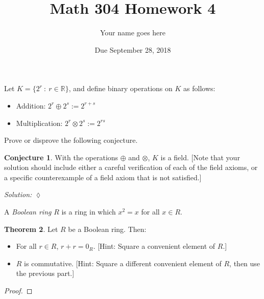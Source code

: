 \documentclass[11pt]{article}		%
\title{Math 304 Homework 4}
\author{Your name goes here}
\date{Due September 28, 2018}
\def\R{{\mathbb R}}
\theoremstyle{definition}
\newtheorem{theorem}{Theorem}
\newtheorem{conj}[theorem]{Conjecture}
\begin{document}
\maketitle


Let $K = \{2^r \ : \ r\in \R\}$, and define binary operations on $K$ as follows:
\begin{itemize}
	\item Addition: $2^r \oplus 2^s := 2^{r+s}$
	\item Multiplication: $2^r \otimes 2^s := 2^{rs}$
\end{itemize}

Prove or disprove the following conjecture.

\begin{conj}
	With the operations $\oplus$ and $\otimes$, $K$ is a field. [Note that your solution should include either a careful verification of each of the field axioms, or a specific counterexample of a field axiom that is not satisfied.]
\end{conj}

\medskip

\noindent\textit{Solution:}				 \hfill $\lozenge$


\bigskip

A \textit{Boolean ring} $R$ is a ring in which $x^2 = x$ for all $x\in R$.

\begin{theorem}
	Let $R$ be a Boolean ring.
	Then: 
	\begin{itemize}
		\item For all $r\in R$, $r + r = 0_R$. [Hint: Square a convenient element of $R$.]
		\item $R$ is commutative. [Hint: Square a different convenient element of $R$, then use the previous part.]
	\end{itemize}
\end{theorem}

\begin{proof}

\end{proof}
\end{document}
